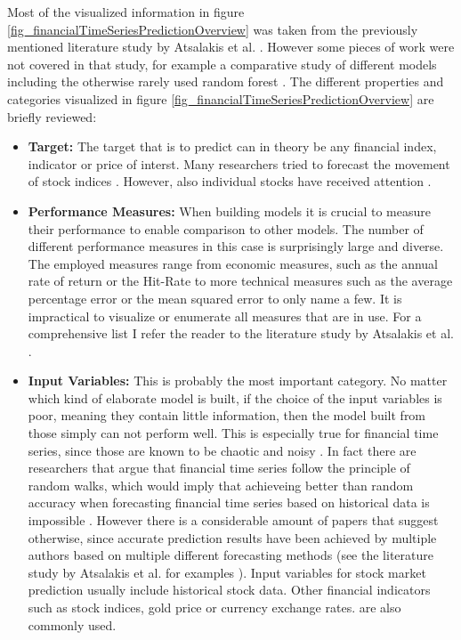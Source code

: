 Most of the visualized information in figure \ref{fig_financialTimeSeriesPredictionOverview} was taken from the previously mentioned literature study by Atsalakis et al. \cite{atsalakis2009surveying}. However  some pieces of work were not covered in that study, for example a comparative study of different models including the otherwise rarely used random forest \cite{kumar2006forecasting}. The different properties and categories visualized in figure \ref{fig_financialTimeSeriesPredictionOverview} are briefly reviewed:

\begin{itemize}
	\item \textbf{Target:} The target that is to predict can in theory be any financial index, indicator or price of interst. Many researchers tried to forecast the movement of stock indices \cite{zhang2009stock} \cite{van2001financial} \cite{kumar2006forecasting} . However, also individual stocks have received attention \cite{mahfoud1996financial}. 
	\item \textbf{Performance Measures:} When building models it is crucial to measure their performance to enable comparison to other models. The number of different performance measures in this case is surprisingly large and diverse. The employed measures range from economic measures, such as the annual rate of return or the Hit-Rate to more technical measures such as the average percentage error or the mean squared error to only name a few. It is impractical to visualize or enumerate all measures that are in use. For a comprehensive list I refer the reader to the literature study by Atsalakis et al. \cite{atsalakis2009surveying}.
	\item \textbf{Input Variables:} This is probably the most important category. No matter which kind of elaborate model is built, if the choice of the input variables is poor, meaning they contain little information, then the model built from those simply can not perform well. This is especially true for financial time series, since those are known to be chaotic and noisy \cite{zhang2009stock}. In fact there are researchers that argue that financial time series follow the principle of random walks, which would imply that achieveing better than random accuracy when forecasting financial time series based on historical data is impossible \cite{fama1965behavior}. However there is a considerable amount of papers that suggest otherwise, since accurate prediction results have been achieved by multiple authors based on multiple different forecasting methods (see the literature study by Atsalakis et al. for examples \cite{atsalakis2009surveying} ). Input variables for stock market prediction usually include historical stock data. Other financial indicators such as stock indices, gold price or currency exchange rates. are also commonly used.

\end{itemize}
